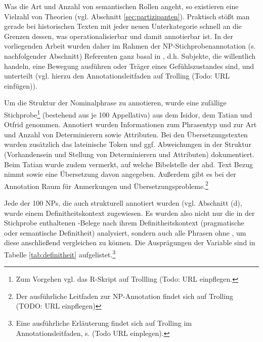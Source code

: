 Was die Art und Anzahl von semantischen Rollen angeht, so  existieren eine Vielzahl von Theorien (vgl. Abschnitt \ref{sec:partizipanten}). Praktisch stößt man gerade bei historischen Texten mit jeder neuen Unterkategorie schnell an die Grenzen dessen, was operationalisierbar und damit annotierbar ist. In der vorliegenden Arbeit wurden daher im Rahmen der NP-Stichprobenannotation (s. nachfolgender Abschnitt) Referenten ganz basal in , d.h. Subjekte, die willentlich handeln,  eine Bewegung ausführen oder Träger eines Gefühlszustandes sind,  und  unterteilt (vgl. hierzu den Annotationsleitfaden auf Trolling (Todo: URL einfügen)). 



Um die Struktur der Nominalphrase zu annotieren, wurde eine zufällige Stichprobe\footnote{Zum Vorgehen vgl. das R-Skript  auf Trollling (Todo: URL einpflegen.} (bestehend aus je 100 Appellativa) aus dem Isidor, dem Tatian und Otfrid genommen. Annotiert wurden Informationen zum Phrasentyp und zur Art und Anzahl von Determinierern sowie Attributen. 
Bei den Übersetzungstexten wurden zusätzlich das lateinische Token und ggf. Abweichungen in der Struktur (Vorhandensein und Stellung von Determinierern und Attributen) dokumentiert. Beim Tatian wurde zudem vermerkt, auf welche Bibelstelle der ahd. Text Bezug nimmt sowie eine Übersetzung davon angegeben. Außerdem gibt es bei der Annotation Raum für Anmerkungen und Übersetzungsprobleme.\footnote{Der ausführliche Leitfaden zur NP-Annotation findet sich auf Trolling (TODO: URL einpflegen)}  

Jede der 100 NPs, die auch strukturell annotiert wurden (vgl. Abschnitt (d), wurde einem Definitheitskontext zugewiesen. Es wurden also nicht nur die in der Stichprobe enthaltenen -Belege nach ihrem Definitheitskontext (pragmatische oder semantische Definitheit) analysiert, sondern auch alle Phrasen ohne , um diese anschließend vergleichen zu können. Die Ausprägungen der Variable  sind in Tabelle \ref{tab:definitheit} aufgelistet.\footnote{Eine ausführliche Erläuterung findet sich auf Trolling im Annotationsleitfaden, s. (Todo URL einplegen).}

